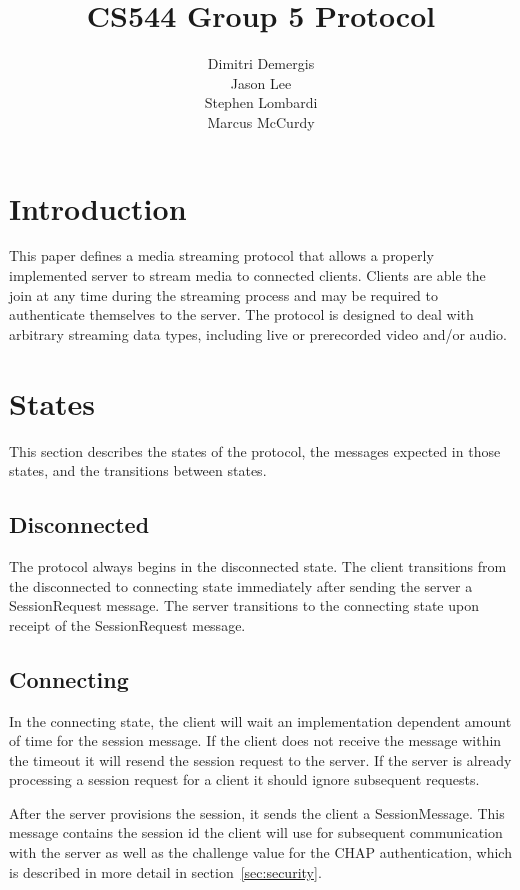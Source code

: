 \documentclass[12pt,letterpaper,titlepage]{article}
\author{Dimitri Demergis \\ Jason Lee \\ Stephen Lombardi \\ Marcus McCurdy}
\title{CS544 Group 5 Protocol}
\begin{document}
\maketitle

\tableofcontents

\pagebreak

\section{Introduction}
This paper defines a media streaming protocol that allows a properly implemented server to stream media to connected clients. Clients are able the join at any time during the streaming process and may be required to authenticate themselves to the server. The protocol is designed to deal with arbitrary streaming data types, including live or prerecorded video and/or audio.


\section{States}
This section describes the states of the protocol, the messages expected in those states, and the
transitions between states.

\subsection{Disconnected}
The protocol always begins in the disconnected state. The client transitions from the disconnected
to connecting state immediately after  sending the server a SessionRequest message. 
The server transitions to the connecting state upon receipt of the SessionRequest message.

\subsection{Connecting}
In the connecting state, the client will wait an implementation dependent amount of time for the 
session message. If the client does not receive the message within the timeout it will resend
the session request to the server. If the server is already processing a session request for a client
it should ignore subsequent requests.

After the server provisions the session, it sends the client a SessionMessage. This message 
contains the session id the client will use for subsequent communication with the server as
well as the challenge value for the CHAP authentication, which is described in more detail
in section~\ref{sec:security}.
\end{document}
